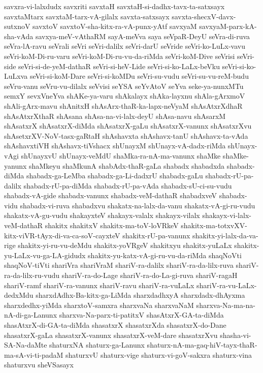 {savxra-vi-lalxdudx
savxriti
savxtaH
savxtaH-si-dadhx-tavx-ta-satxsayx
savxtaMtarx
savxtaM-tarx-vA-gilalx
savxta-satxsayx
savxta-shecxV-davx-sutxnoV
savxtoV
savxtoV-sha-kitx-ra-vA-punx-yAtf
savxyaM
savxyaM-parx-kA-sha-vAda
savxya-meV-vAthaRM
sayA-meVva
saya
seVpaR-DeyU
seVra-di-ruva
seVra-lA-ravu
seVrali
seVri
seVri-dalilx
seVri-darU
seVride
seVri-ko-LuLx-vavu
seVri-koM-Di-ru-varu
seVri-koM-Di-ru-vu-da-riMda
seVri-koM-Dive
seVrisi
seVri-side
seVri-si-de-yeM-dathaR
seVri-si-heV-Lide
seVri-si-ko-LaLx-beVku
seVri-si-ko-LuLxva
seVri-si-koM-Dare
seVri-si-koMDu
seVri-su-vudu
seVri-su-vu-reM-budu
seVru-vanu
seVru-vu-dilalx
seVvisi
seYSA
seYvAtoV
seYva
seke-ya-nunxMTu
semxY
sevxVneYva
shAKe-ya-varu
shAkalayx
shAka-layxnu
shAla-gArxmoV
shAli-gArx-mavu
shAnitxH
shAsArx-thaR-ka-lapx-neVyaM
shAsAtxrXdhaR
shAsAtxrXthaR
shAsana
shAsa-na-vi-lalx-deyU
shAsa-navu
shAsarxM
shAsatxrX
shAsatxrX-diMda
shAsatxrX-gaLu
shAsatxrX-vanunx
shAsatxrXvu
shAsetxrXV-NoV-tasx-gaRtaH
shAshavxta
shAshavx-tanU
shAshavx-ta-vAda
shAshavxtiVH
shAshavx-tiVshacx
shUnayxM
shUnayx-vA-dadx-riMda
shUnayx-vAgi
shUnayxvU
shUnayx-veMdU
shaMka-ra-nA-ma-vanunx
shaMke
shaMke-yanunx
shaMkeyu
shaMkunA
shabAdx-thaR-gaLa
shabadx
shabadxda
shabadx-diMda
shabadx-ga-LeMba
shabadx-ga-Li-dadxrU
shabadx-gaLu
shabadx-rU-pa-dalilx
shabadx-rU-pa-diMda
shabadx-rU-pa-vAda
shabadx-sU-ci-su-vudu
shabadx-vA-gide
shabadx-vanunx
shabadx-veM-dathaR
shabadxveV
shabadx-vidu
shabadx-vi-ruva
shabadxvu
shakatx-na-lalx-da-vanu
shakatx-vA-gi-ru-vudu
shakatx-vA-gu-vudu
shakayxteV
shakayx-valalx
shakayx-vilalx
shakayx-vi-lalx-veM-dathaR
shakitx
shakitxV
shakitx-ma-toV-loVRkeV
shakitx-ma-totxvXV-kitx-viVR-tAyx-di-va-ca-soV-cayxteV
shakitx-rU-pa-vanunx
shakitx-yi-lalx-da-va-rige
shakitx-yi-ru-vu-deMdu
shakitx-yoVRgeV
shakitxyu
shakitx-yuLaLx
shakitx-yu-LaLx-vu-ga-LA-gidudx
shakitx-yu-katx-vA-gi-ru-vu-da-riMda
shaqNoVti
shaqNoV-tiVti
shariVra
shariVraM
shariV-ra-dalilx
shariV-ra-da-lilx-ruva
shariV-ra-da-lilx-ru-vudu
shariV-ra-do-Lage
shariV-ra-do-La-gi-ruva
shariV-ragaH
shariV-ramf
shariV-ra-vanunx
shariV-ravu
shariV-ra-vuLaLx
shariV-ra-vu-LaLx-dedxMdu
sharxdAdhx-Ba-kitx-ga-LiMda
sharxdadhxyA
sharxdadx-dhAyxma
sharxdedhx-yiMda
sharxtoV-samxra
sharxvaNa
sharxvaNaM
sharxva-Na-ma-na-nA-di-ga-Lanunx
sharxva-Na-parx-ti-patitxV
shasAtxrX-GA-ta-diMda
shasAtxrX-di-GA-ta-diMda
shasatxrX
shasatxrXda
shasatxrX-do-Dane
shasatxrX-gaLa
shasatxrX-vanunx
shasatxrX-veM-dare
shasatxrXvu
shasha-vi-SA-Na-daMte
shaturxNA
shaturx-ga-Lanunx
shaturx-nA-ma-gaq-hiV-tayx-thaR-ma-sA-vi-ti-padaM
shaturxvU
shaturx-vige
shaturx-vi-goV-sakxra
shaturx-vina
shaturxvu
sheVSasayx
}
